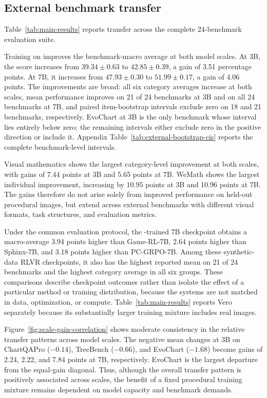 \newpage


\subsection{External benchmark transfer}
\label{sec:external-transfer}

Table~\ref{tab:main-results} reports transfer across the complete
24-benchmark evaluation suite.

Training on \trace improves the benchmark-macro average at both model scales.
At 3B, the score increases from $39.34\pm0.63$ to $42.85\pm0.39$, a gain of
3.51 percentage points. At 7B, it increases from $47.93\pm0.30$ to
$51.99\pm0.17$, a gain of 4.06 points. The improvements are broad: all six
category averages increase at both scales, mean performance improves on 21 of
24 benchmarks at 3B and on all 24 benchmarks at 7B, and paired item-bootstrap
intervals exclude zero on 18 and 21 benchmarks, respectively. EvoChart at 3B
is the only benchmark whose interval lies entirely below zero; the remaining
intervals either exclude zero in the positive direction or include it.
Appendix Table~\ref{tab:external-bootstrap-cis} reports the complete
benchmark-level intervals.

Visual mathematics shows the largest category-level improvement at both scales,
with gains of 7.44 points at 3B and 5.65 points at 7B. WeMath shows the largest
individual improvement, increasing by 10.95 points at 3B and 10.96 points at
7B. The gains therefore do not arise solely from improved performance on
held-out procedural images, but extend across external benchmarks with
different visual formats, task structures, and evaluation metrics.

Under the common evaluation protocol, the \trace-trained 7B checkpoint obtains
a macro-average 3.94 points higher than Game-RL-7B, 2.64 points higher than
Sphinx-7B, and 3.18 points higher than PC-GRPO-7B. Among these synthetic-data
RLVR checkpoints, it also has the highest reported mean on 21 of 24 benchmarks
and the highest category average in all six groups. These comparisons describe
checkpoint outcomes rather than isolate the effect of a particular method or
training distribution, because the systems are not matched in data,
optimization, or compute. Table~\ref{tab:main-results} reports Vero separately
because its substantially larger training mixture includes real images.

Figure~\ref{fig:scale-gain-correlation} shows moderate consistency in the
relative transfer patterns across model scales. The negative mean changes at
3B on ChartQAPro ($-0.14$), TreeBench ($-0.66$), and EvoChart ($-1.68$)
become gains of 2.24, 2.22, and 7.84 points at 7B, respectively. EvoChart is
the largest departure from the equal-gain diagonal. Thus, although the overall
transfer pattern is positively associated across scales, the benefit of a
fixed procedural training mixture remains dependent on model capacity and
benchmark demands.
